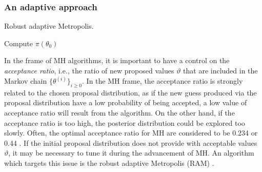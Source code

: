 \subsubsection{An adaptive approach}
\begin{algorithm}[t]
	\caption{Robust adaptive Metropolis.}
	\label{alg:RAM}
	Compute $\pi(\theta_0)$ \;
\end{algorithm}
In the frame of MH algorithms, it is important to have a control on the \textit{acceptance ratio}, i.e., the ratio of new proposed values $\vartheta$ that are included in the Markov chain $\{\theta^{(i)}\}_{i\geq 0}$. In the MH frame, the acceptance ratio is strongly related to the chosen proposal distribution, as if the new guess produced via the proposal distribution have a low probability of being accepted, a low value of acceptance ratio will result from the algorithm. On the other hand, if the acceptance ratio is too high, the posterior distribution could be explored too slowly. Often, the optimal acceptance ratio for MH are considered to be 0.234 or 0.44 \cite{Vih12}. If the initial proposal distribution does not provide with acceptable values $\vartheta$, it may be necessary to tune it during the advancement of MH. An algorithm which targets this issue is the robust adaptive Metropolis (RAM) \cite{Vih12}. 

